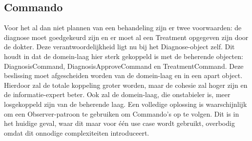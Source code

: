 \subsection{Commando} 
Voor het al dan niet plannen van een behandeling zijn er twee voorwaarden: 
de diagnose moet goedgekeurd zijn en er moet al een Treatment opgegeven zijn door de dokter. 
Deze verantwoordelijkheid ligt nu bij het Diagnose-object zelf. 
Dit houdt in dat de domein-laag hier sterk gekoppeld is met de beherende objecten: DiagnosisCommand, DiagnosisApproveCommand en TreatmentCommand. 
Deze beslissing moet afgescheiden worden van de domein-laag en in een apart object. 
Hierdoor zal de totale koppeling groter worden, maar de cohesie zal hoger zijn en de informatie-expert beter. 
Ook zal de domein-laag, die onstabieler is, meer losgekoppeld zijn van de beherende laag.
Een volledige oplossing is waarschijnlijk om een Observer-patroon te gebruiken om Commando's op te volgen.
Dit is in het huidige geval, waar dit maar voor één use case wordt gebruikt, overbodig omdat dit onnodige complexiteiten introduceert. 
